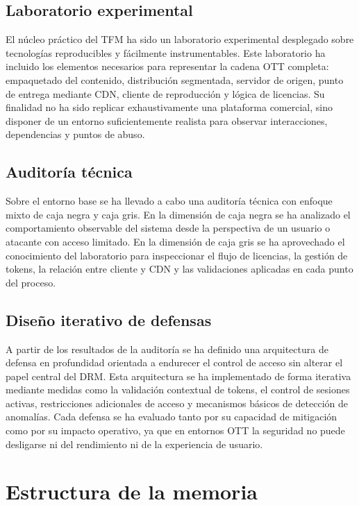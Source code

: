 \subsection{Laboratorio experimental}

El núcleo práctico del TFM ha sido un laboratorio experimental desplegado sobre tecnologías reproducibles y fácilmente instrumentables. Este laboratorio ha incluido los elementos necesarios para representar la cadena OTT completa: empaquetado del contenido, distribución segmentada, servidor de origen, punto de entrega mediante CDN, cliente de reproducción y lógica de licencias. Su finalidad no ha sido replicar exhaustivamente una plataforma comercial, sino disponer de un entorno suficientemente realista para observar interacciones, dependencias y puntos de abuso.

\subsection{Auditoría técnica}

Sobre el entorno base se ha llevado a cabo una auditoría técnica con enfoque mixto de caja negra y caja gris. En la dimensión de caja negra se ha analizado el comportamiento observable del sistema desde la perspectiva de un usuario o atacante con acceso limitado. En la dimensión de caja gris se ha aprovechado el conocimiento del laboratorio para inspeccionar el flujo de licencias, la gestión de tokens, la relación entre cliente y CDN y las validaciones aplicadas en cada punto del proceso.

\subsection{Diseño iterativo de defensas}

A partir de los resultados de la auditoría se ha definido una arquitectura de defensa en profundidad orientada a endurecer el control de acceso sin alterar el papel central del DRM. Esta arquitectura se ha implementado de forma iterativa mediante medidas como la validación contextual de tokens, el control de sesiones activas, restricciones adicionales de acceso y mecanismos básicos de detección de anomalías. Cada defensa se ha evaluado tanto por su capacidad de mitigación como por su impacto operativo, ya que en entornos OTT la seguridad no puede desligarse ni del rendimiento ni de la experiencia de usuario.

\section{Estructura de la memoria}

